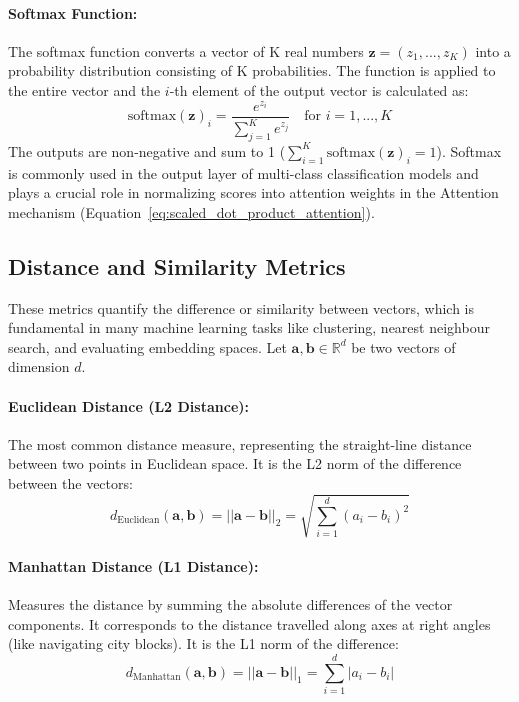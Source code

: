 \paragraph{Softmax Function:}
The softmax function converts a vector of K real numbers \( \bm{z} = (z_1, ..., z_K) \) into a probability distribution consisting of K probabilities. The function is applied to the entire vector and the \( i \)-th element of the output vector is calculated as:
\begin{equation}
  \text{softmax}(\bm{z})_i = \frac{e^{z_i}}{\sum_{j=1}^K e^{z_j}} \quad \text{for } i = 1, ..., K
\end{equation}
The outputs are non-negative and sum to 1 (\( \sum_{i=1}^K \text{softmax}(\bm{z})_i = 1 \)). Softmax is commonly used in the output layer of multi-class classification models and plays a crucial role in normalizing scores into attention weights in the Attention mechanism (Equation~\ref{eq:scaled_dot_product_attention}).

\subsection{Distance and Similarity Metrics}
\label{subsec:distance_metrics}
These metrics quantify the difference or similarity between vectors, which is fundamental in many machine learning tasks like clustering, nearest neighbour search, and evaluating embedding spaces. Let \( \bm{a}, \bm{b} \in \mathbb{R}^d \) be two vectors of dimension \( d \).

\paragraph{Euclidean Distance (L2 Distance):}
\label{eq:euclidean_distance}
The most common distance measure, representing the straight-line distance between two points in Euclidean space. It is the L2 norm of the difference between the vectors:
\begin{equation}
  d_{\text{Euclidean}}(\bm{a}, \bm{b}) = ||\bm{a} - \bm{b}||_2 = \sqrt{\sum_{i=1}^d (a_i - b_i)^2}
\end{equation}

\paragraph{Manhattan Distance (L1 Distance):}
Measures the distance by summing the absolute differences of the vector components. It corresponds to the distance travelled along axes at right angles (like navigating city blocks). It is the L1 norm of the difference:
\begin{equation}
  d_{\text{Manhattan}}(\bm{a}, \bm{b}) = ||\bm{a} - \bm{b}||_1 = \sum_{i=1}^d |a_i - b_i|
\end{equation}

